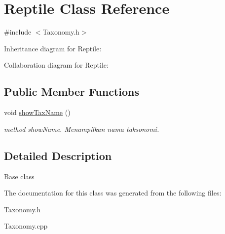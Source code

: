 \hypertarget{classReptile}{}\section{Reptile Class Reference}
\label{classReptile}


{\ttfamily \#include $<$Taxonomy.\+h$>$}



Inheritance diagram for Reptile\+:


Collaboration diagram for Reptile\+:
\subsection*{Public Member Functions}
\begin{DoxyCompactItemize}
\item 
void \hyperlink{classReptile_a21e391670ad15c72918f7a948db898bd}{show\+Tax\+Name} ()\hypertarget{classReptile_a21e391670ad15c72918f7a948db898bd}{}\label{classReptile_a21e391670ad15c72918f7a948db898bd}

\begin{DoxyCompactList}\small\item\em method show\+Name. Menampilkan nama taksonomi. \end{DoxyCompactList}\end{DoxyCompactItemize}


\subsection{Detailed Description}
Base class 

The documentation for this class was generated from the following files\+:\begin{DoxyCompactItemize}
\item 
Taxonomy.\+h\item 
Taxonomy.\+cpp\end{DoxyCompactItemize}
